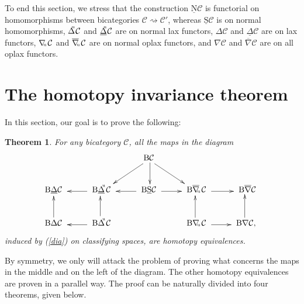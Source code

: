 \documentclass[]{amsart}
\newtheorem{theorem}{Theorem}[section]
\begin{document}
To end this section, we stress that the construction  ${\ensuremath{\underline{\mathrm{N}}}}{\ensuremath{\mathcal{C}}}$ is functorial on homomorphisms
between bicategories ${\ensuremath{\mathcal{C}}}\rightsquigarrow{\ensuremath{\mathcal{C}}}'$, whereas  $\underline{\mathrm{S}}{\ensuremath{\mathcal{C}}}$ is on normal
homomorphisms, ${\ensuremath{\Delta}}\hspace{-4pt}^{^\mathrm{u}}{\ensuremath{\mathcal{C}}}$ and  ${\ensuremath{\underline{\Delta}}}\hspace{-4pt}^{^\mathrm{u}}{\ensuremath{\mathcal{C}}}$ are
on normal lax functors, ${\ensuremath{\Delta}}{\ensuremath{\mathcal{C}}}$ and ${\ensuremath{\underline{\Delta}}}{\ensuremath{\mathcal{C}}}$ are on lax functors,
$\nabla\hspace{-2.5pt}_{^{_\mathrm{u}}}{\ensuremath{\mathcal{C}}}$ and
$\overline{\nabla}\hspace{-2.5pt}_{^{_\mathrm{u}}}{\ensuremath{\mathcal{C}}}$ are on normal oplax functors, and  $\nabla{\ensuremath{\mathcal{C}}}$
and $\overline{\nabla}{\ensuremath{\mathcal{C}}}$ are on all oplax functors.

\section{The homotopy invariance theorem} In this section, our goal is to prove the following:
\begin{theorem}\label{thit}
 For any bicategory ${\ensuremath{\mathcal{C}}}$, all the maps in the diagram
$$
\xymatrix{&&\ \  {\ensuremath{\mathrm{B}}}{\ensuremath{\mathcal{C}}} \ar@<1.5pt>[d]\ar@<1.5pt>[dl]\ \ \ar@<-1.5pt>[dr]&&\\ {\ensuremath{\mathrm{B}}}{\ensuremath{\underline{\Delta}}}{\ensuremath{\mathcal{C}}}\ &
\ar@<1.5pt>[l]\ {\ensuremath{\mathrm{B}}}{\ensuremath{\underline{\Delta}}}\hspace{-3pt}^{^\mathrm{u}}{\ensuremath{\mathcal{C}}}\ &  \ar@<1.5pt>[l]\
{\ensuremath{\mathrm{B}}}\underline{\mathrm{S}}{\ensuremath{\mathcal{C}}} \ \ar@<-1.5pt>[r] &\
{\ensuremath{\mathrm{B}}}\overline{\nabla}\hspace{-2.5pt}_{^{_\mathrm{u}}}{\ensuremath{\mathcal{C}}}\  \ar@<-1.5pt>[r]& \
{\ensuremath{\mathrm{B}}}\overline{\nabla}{\ensuremath{\mathcal{C}}}
\\ \ar@<1.5pt>[u]{\ensuremath{\mathrm{B}}}{\ensuremath{\Delta}}{\ensuremath{\mathcal{C}}}\
&\ar@<1.5pt>[l]\ {\ensuremath{\mathrm{B}}}{\ensuremath{\Delta}}\hspace{-3pt}^{^\mathrm{u}}{\ensuremath{\mathcal{C}}} \ \ar@<1.5pt>[u] &&\
{\ensuremath{\mathrm{B}}}\nabla\hspace{-2.5pt}_{^{_\mathrm{u}}}{\ensuremath{\mathcal{C}}} \ \ar@<1.5pt>[u] \ar@<-1.5pt>[r] & \ {\ensuremath{\mathrm{B}}}\nabla{\ensuremath{\mathcal{C}}},
\ \ar@<1.5pt>[u]}
$$
induced by (\ref{dia}) on classifying spaces, are homotopy equivalences.
\end{theorem}
By symmetry, we only will attack the problem of proving what concerns the maps in the middle and on
the left of the diagram. The other homotopy equivalences are proven in a parallel way. The proof
can be  naturally divided into four theorems, given  below.
\end{document}
